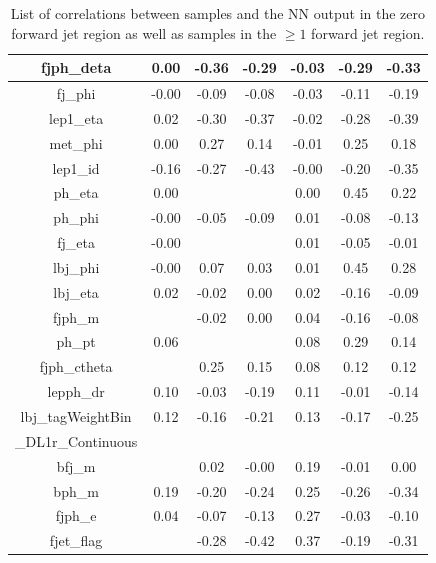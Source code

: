 \begin{table}[htbp]
\begin{tabular}{c|c c c|c c c}
        fjph\_deta                        &  0.00 &     -0.36 &  -0.29 & -0.03 &     -0.29 &  -0.33 \\ \hline
        fj\_phi                           & -0.00 &     -0.09 &  -0.08 & -0.03 &     -0.11 &  -0.19 \\ \hline
        lep1\_eta                         &  0.02 &     -0.30 &  -0.37 & -0.02 &     -0.28 &  -0.39 \\ \hline
        met\_phi                          &  0.00 &      0.27 &   0.14 & -0.01 &      0.25 &   0.18 \\ \hline
        lep1\_id                          & -0.16 &     -0.27 &  -0.43 & -0.00 &     -0.20 &  -0.35 \\ \hline
        ph\_eta                           &  0.00 &        &     &  0.00 &      0.45 &   0.22 \\ \hline
        ph\_phi                           & -0.00 &     -0.05 &  -0.09 &  0.01 &     -0.08 &  -0.13 \\ \hline
        fj\_eta                           & -0.00 &        &     &  0.01 &     -0.05 &  -0.01 \\ \hline
        lbj\_phi                          & -0.00 &      0.07 &   0.03 &  0.01 &      0.45 &   0.28 \\ \hline
        lbj\_eta                          &  0.02 &     -0.02 &   0.00 &  0.02 &     -0.16 &  -0.09 \\ \hline
        fjph\_m                           &    &     -0.02 &   0.00 &  0.04 &     -0.16 &  -0.08 \\ \hline
        ph\_pt                            &  0.06 &        &     &  0.08 &      0.29 &   0.14 \\ \hline
        fjph\_ctheta                      &    &      0.25 &   0.15 &  0.08 &      0.12 &   0.12 \\ \hline
        lepph\_dr                         &  0.10 &     -0.03 &  -0.19 &  0.11 &     -0.01 &  -0.14 \\ \hline
        lbj\_tagWeightBin &  0.12 &     -0.16 &  -0.21 &  0.13 &     -0.17 &  -0.25 \\ 
        \_DL1r\_Continuous &&&&&&\\ \hline
        bfj\_m                            &    &      0.02 &  -0.00 &  0.19 &     -0.01 &   0.00 \\ \hline
        bph\_m                            &  0.19 &     -0.20 &  -0.24 &  0.25 &     -0.26 &  -0.34 \\ \hline
        fjph\_e                           &  0.04 &     -0.07 &  -0.13 &  0.27 &     -0.03 &  -0.10 \\ \hline
        fjet\_flag                        &    &     -0.28 &  -0.42 &  0.37 &     -0.19 &  -0.31 \\ \hline
        \bottomrule
        \end{tabular}
    \caption{List of correlations between samples and the NN output in the zero forward jet region as well as samples in the $\geq 1$ forward jet region.}
    \label{tab:corrAll}
\end{table}

